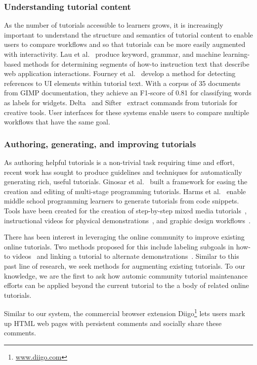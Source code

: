 \subsubsection{Understanding tutorial content}

As the number of tutorials accessible to learners grows, it is increasingly important to understand the structure and semantics of tutorial content to enable users to compare workflows and so that tutorials can be more easily augmented with interactivity.
Lau et al.~\cite{lau_interpreting_2009} produce keyword, grammar, and machine learning-based methods for determining segments of how-to instruction text that describe web application interactions.
Fourney et al.~\cite{fourney_then_2012} develop a method for detecting references to UI elements within tutorial text.
With a corpus of 35 documents from GIMP documentation, they achieve an F1-score of 0.81 for classifying words as labels for widgets.
Delta~\cite{kong_delta_2012} and Sifter~\cite{pavel_browsing_2013} extract commands from tutorials for creative tools.
User interfaces for these systems enable users to compare multiple workflows that have the same goal.

\subsubsection{Authoring, generating, and improving tutorials}

As authoring helpful tutorials is a non-trivial task requiring time and effort, recent work has sought to produce guidelines and techniques for automatically generating rich, useful tutorials.
Ginosar et al.~\cite{ginosar_authoring_2013} built a framework for easing the creation and editing of multi-stage programming tutorials.
Harms et al.~\cite{harms_automatically_2013} enable middle school programming learners to generate tutorials from code snippets.
Tools have been created for the creation of step-by-step mixed media tutorials~\cite{chi_mixt_2012}, instructional videos for physical demonstrations~\cite{chi_democut_2013}, and graphic design workflows~\cite{grossman_chronicle_2010}.

There has been interest in leveraging the online community to improve existing online tutorials.
Two methods proposed for this include labeling subgoals in how-to videos~\cite{kim_learnersourcing_2013} and linking a tutorial to alternate demonstrations~\cite{lafreniere_community_2013}.
Similar to this past line of research, we seek methods for augmenting existing tutorials.
To our knowledge, we are the first to ask how automic community tutorial maintenance efforts can be applied beyond the current tutorial to the a body of related online tutorials.

Similar to our system, the commercial browser extension Diigo\footnote{\url{www.diigo.com}} lets users mark up HTML web pages with persistent comments and socially share these comments.
